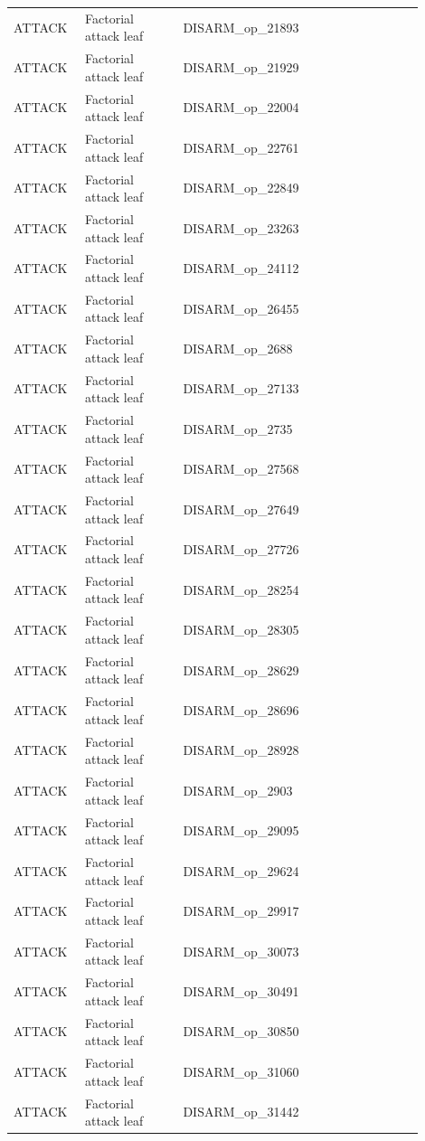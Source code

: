 \begin{table}[htbp]
\begin{threeparttable}
\begin{tabular}{p{0.14\linewidth}p{0.22\linewidth}p{0.54\linewidth}}
ATTACK & Factorial attack leaf & DISARM\_op\_21893 \\
ATTACK & Factorial attack leaf & DISARM\_op\_21929 \\
ATTACK & Factorial attack leaf & DISARM\_op\_22004 \\
ATTACK & Factorial attack leaf & DISARM\_op\_22761 \\
ATTACK & Factorial attack leaf & DISARM\_op\_22849 \\
ATTACK & Factorial attack leaf & DISARM\_op\_23263 \\
ATTACK & Factorial attack leaf & DISARM\_op\_24112 \\
ATTACK & Factorial attack leaf & DISARM\_op\_26455 \\
ATTACK & Factorial attack leaf & DISARM\_op\_2688 \\
ATTACK & Factorial attack leaf & DISARM\_op\_27133 \\
ATTACK & Factorial attack leaf & DISARM\_op\_2735 \\
ATTACK & Factorial attack leaf & DISARM\_op\_27568 \\
ATTACK & Factorial attack leaf & DISARM\_op\_27649 \\
ATTACK & Factorial attack leaf & DISARM\_op\_27726 \\
ATTACK & Factorial attack leaf & DISARM\_op\_28254 \\
ATTACK & Factorial attack leaf & DISARM\_op\_28305 \\
ATTACK & Factorial attack leaf & DISARM\_op\_28629 \\
ATTACK & Factorial attack leaf & DISARM\_op\_28696 \\
ATTACK & Factorial attack leaf & DISARM\_op\_28928 \\
ATTACK & Factorial attack leaf & DISARM\_op\_2903 \\
ATTACK & Factorial attack leaf & DISARM\_op\_29095 \\
ATTACK & Factorial attack leaf & DISARM\_op\_29624 \\
ATTACK & Factorial attack leaf & DISARM\_op\_29917 \\
ATTACK & Factorial attack leaf & DISARM\_op\_30073 \\
ATTACK & Factorial attack leaf & DISARM\_op\_30491 \\
ATTACK & Factorial attack leaf & DISARM\_op\_30850 \\
ATTACK & Factorial attack leaf & DISARM\_op\_31060 \\
ATTACK & Factorial attack leaf & DISARM\_op\_31442 \\

\end{tabular}
\end{threeparttable}
\end{table}
